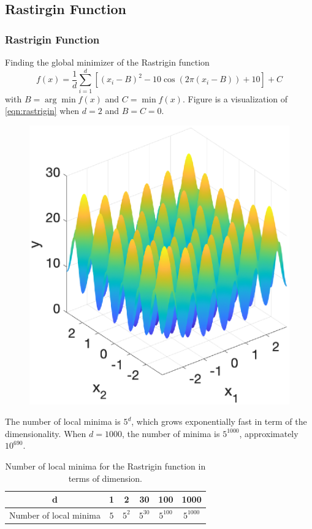 \documentclass{beamer}
\begin{document}
\subsection{Rastirgin Function}
\begin{frame}
	\frametitle{Rastrigin Function}
	Finding the global minimizer of the Rastrigin function
\begin{equation}\label{eqn:rastrigin}
	f(x) = \frac{1}{d} \sum_{i=1}^d \left[(x_i-B)^2 -10\cos(2\pi (x_i-B)) + 10\right] + C
\end{equation}
with $B = \arg \min f(x)$ and $C= \min f(x)$. Figure is a visualization of \eqref{eqn:rastrigin} when $d=2$ and $B=C=0$. 

\begin{figure}[ht]
	\centering
	\includegraphics[width=0.6\linewidth]{Figure/R_function}
\end{figure}
\end{frame}

\begin{frame}
	The number of local minima is $5^d$, which grows exponentially fast in term of the dimensionality. When $d=1000$, the number of minima is $5^{1000}$, approximately $10^{690}$.
\begin{table}[ht]

	\centering\begin{tabular}{|c|c|c|c|c|c|}
	\hline
	d & 1 & 2 & 30 & 100 & 1000 \\
	\hline
	Number of local minima & $5$ & $5^2$ & $5^{30}$ & $5^{100}$ & $5^{1000}$\\
	\hline 
	\end{tabular}
	\caption{Number of local minima for the Rastrigin function in terms of dimension.}
	\label{tbl:Number of local minimum}
\end{table}

\end{frame}
\end{document}
